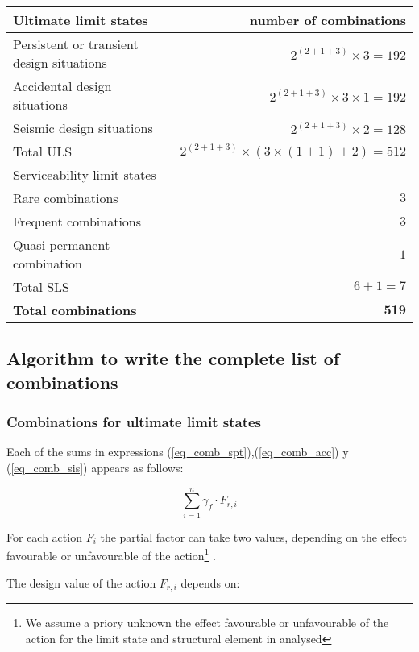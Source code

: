 \begin{center}
\begin{small}
\begin{tabular}{lr}
\hline
Ultimate limit states & number of combinations \\
\hline
Persistent or transient design situations & $2^{(2+1+3)}\times 3= 192$ \\
Accidental design situations & $2^{(2+1+3)}\times 3 \times 1= 192$ \\
Seismic design situations & $2^{(2+1+3)}\times 2= 128$ \\
\hline
Total ULS & $2^{(2+1+3)} \times (3\times(1+1)+2)= 512$ \\ 
\hline
Serviceability limit states & \\
\hline
Rare combinations & $3$ \\
Frequent combinations & $3$ \\
Quasi-permanent combination & $1$ \\
\hline
Total SLS & $6 + 1= 7$ \\
\hline
\textbf{Total combinations} & $\mathbf{519}$ \\ 
\hline
\end{tabular}
\end{small}
\end{center}

\subsection{Algorithm to write the complete list of combinations}

\subsubsection{Combinations for ultimate limit states}
Each of the sums in expressions (\ref{eq_comb_spt}),(\ref{eq_comb_acc}) y (\ref{eq_comb_sis}) appears as follows:


\begin{equation} \label{eq_sumatorio}
\sum_{i=1}^n \gamma_f \cdot F_{r,i}
\end{equation}

For each action $F_i$ the partial factor can take two values, depending on the effect favourable or unfavourable of the action\footnote{We assume a priory unknown the effect favourable or unfavourable of the action for the limit state and structural element in analysed} .

The design value of the action $F_{r,i}$ depends on:

